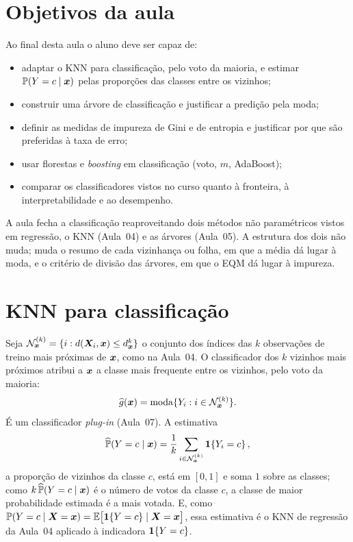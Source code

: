 \documentclass[11pt,a4paper]{article}
\begin{document}

\section*{Objetivos da aula}
Ao final desta aula o aluno deve ser capaz de:
\begin{itemize}[leftmargin=1.4cm]
  \item adaptar o KNN para classificação, pelo voto da maioria, e estimar
        $\mathbb{P}(Y=c\mid\bm{x})$ pelas proporções das classes entre os vizinhos;
  \item construir uma árvore de classificação e justificar a predição pela moda;
  \item definir as medidas de impureza de Gini e de entropia e justificar por que
        são preferidas à taxa de erro;
  \item usar florestas e \emph{boosting} em classificação (voto, $m$, AdaBoost);
  \item comparar os classificadores vistos no curso quanto à fronteira, à
        interpretabilidade e ao desempenho.
\end{itemize}

\begin{emsala}
A aula fecha a classificação reaproveitando dois métodos não paramétricos vistos em
regressão, o KNN (Aula~04) e as árvores (Aula~05). A estrutura dos dois não muda; muda
o resumo de cada vizinhança ou folha, em que a média dá lugar à moda, e o critério de
divisão das árvores, em que o EQM dá lugar à impureza.
\end{emsala}

\section{KNN para classificação}
Seja $\mathcal{N}_{\bm{x}}^{(k)}=\{i : d(\bm{X}_i,\bm{x})\le d^k_{\bm{x}}\}$ o conjunto dos índices das
$k$ observações de treino mais próximas de $\bm{x}$, como na Aula~04. O classificador dos
$k$ vizinhos mais próximos atribui a $\bm{x}$ a classe mais frequente entre os vizinhos,
pelo voto da maioria:
\begin{equation}\label{eq:knncls}
  \widehat{g}(\bm{x}) = \operatorname{moda}\{Y_i : i\in\mathcal{N}_{\bm{x}}^{(k)}\}.
\end{equation}
É um classificador \emph{plug-in} (Aula~07). A estimativa
\[
  \widehat{\mathbb{P}}(Y=c\mid\bm{x}) = \frac{1}{k}\sum_{i\in\mathcal{N}_{\bm{x}}^{(k)}}\mathbf{1}\!\left\{Y_i=c\right\},
\]
a proporção de vizinhos da classe $c$, está em $[0,1]$ e soma $1$ sobre as classes;
como $k\,\widehat{\mathbb{P}}(Y=c\mid\bm{x})$ é o número de votos da classe $c$, a classe de maior
probabilidade estimada é a mais votada. E, como
$\mathbb{P}(Y=c\mid\bm{X}=\bm{x})=\mathbb{E}\big[\mathbf{1}\!\left\{Y=c\right\}\mid\bm{X}=\bm{x}\big]$, essa estimativa é o KNN de regressão
da Aula~04 aplicado à indicadora $\mathbf{1}\!\left\{Y=c\right\}$.
\end{document}
